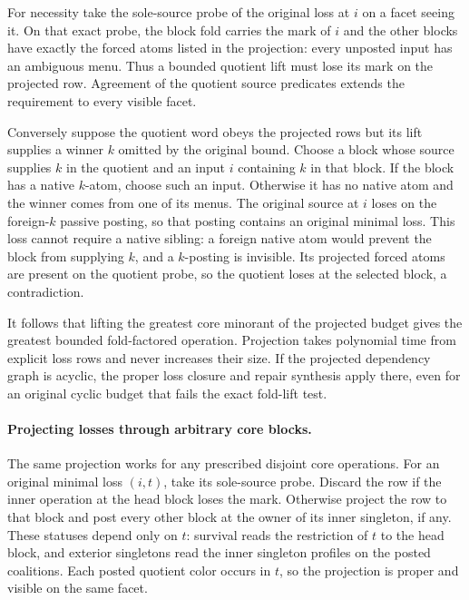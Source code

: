 For necessity take the sole-source probe of the
original loss at $i$ on a facet seeing it. On
that exact probe, the block fold carries the mark
of $i$ and the other blocks have exactly the forced
atoms listed in the projection: every unposted
input has an ambiguous menu. Thus a bounded
quotient lift must lose its mark on the projected
row. Agreement of the quotient source predicates
extends the requirement to every visible facet.

Conversely suppose the quotient word obeys the
projected rows but its lift supplies a winner $k$
omitted by the original bound. Choose a block
whose source supplies $k$ in the quotient and an
input $i$ containing $k$ in that block. If the
block has a native $k$-atom, choose such an input.
Otherwise it has no native atom and the winner
comes from one of its menus. The original source
at $i$ loses on the foreign-$k$ passive posting,
so that posting contains an original minimal loss.
This loss cannot require a native sibling:
a foreign native atom would prevent the block
from supplying $k$, and a $k$-posting is invisible.
Its projected forced atoms are present on the
quotient probe, so the quotient loses at the
selected block, a contradiction.

It follows that lifting the greatest core minorant
of the projected budget gives the greatest bounded
fold-factored operation. Projection takes polynomial
time from explicit loss rows and never increases
their size. If the projected dependency graph is
acyclic, the proper loss closure and repair synthesis
apply there, even for an original cyclic budget
that fails the exact fold-lift test.

\paragraph{Projecting losses through arbitrary core blocks.}
The same projection works for any prescribed disjoint
core operations. For an original minimal loss $(i,t)$,
take its sole-source probe. Discard the row if the
inner operation at the head block loses the mark.
Otherwise project the row to that block and post every
other block at the owner of its inner singleton, if
any. These statuses depend only on $t$: survival reads
the restriction of $t$ to the head block, and exterior
singletons read the inner singleton profiles on the
posted coalitions. Each posted quotient color occurs
in $t$, so the projection is proper and visible on
the same facet.

